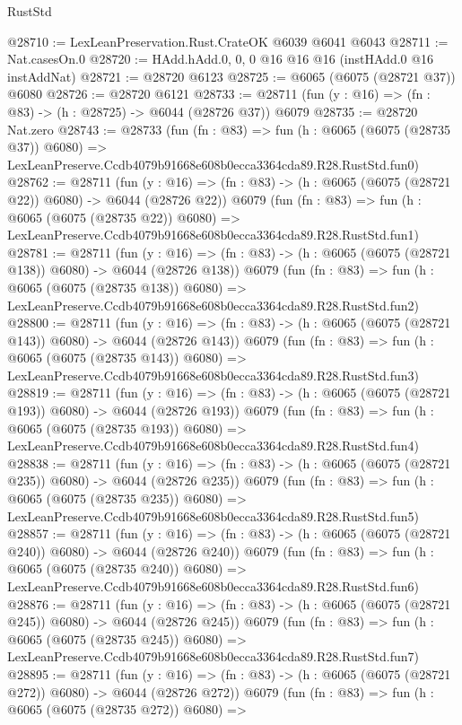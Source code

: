 \begin{lexlean}{RustStd}
\begin{coremodule}
@28710 := LexLeanPreservation.Rust.CrateOK @6039 @6041 @6043
@28711 := Nat.casesOn.{0}
@28720 := HAdd.hAdd.{0, 0, 0} @16 @16 @16 (instHAdd.{0} @16 instAddNat)
@28721 := @28720 @6123
@28725 := @6065 (@6075 (@28721 @37)) @6080
@28726 := @28720 @6121
@28733 := @28711 (fun (y : @16) => (fn : @83) -> (h : @28725) -> @6044 (@28726 @37)) @6079
@28735 := @28720 Nat.zero
@28743 := @28733
    (fun (fn : @83) =>
    fun (h : @6065 (@6075 (@28735 @37)) @6080) =>
    LexLeanPreserve.Ccdb4079b91668e608b0ecca3364cda89.R28.RustStd.fun0)
@28762 := @28711
    (fun (y : @16) => (fn : @83) -> (h : @6065 (@6075 (@28721 @22)) @6080) -> @6044 (@28726 @22))
    @6079
    (fun (fn : @83) =>
    fun (h : @6065 (@6075 (@28735 @22)) @6080) =>
    LexLeanPreserve.Ccdb4079b91668e608b0ecca3364cda89.R28.RustStd.fun1)
@28781 := @28711
    (fun (y : @16) => (fn : @83) -> (h : @6065 (@6075 (@28721 @138)) @6080) -> @6044 (@28726 @138))
    @6079
    (fun (fn : @83) =>
    fun (h : @6065 (@6075 (@28735 @138)) @6080) =>
    LexLeanPreserve.Ccdb4079b91668e608b0ecca3364cda89.R28.RustStd.fun2)
@28800 := @28711
    (fun (y : @16) => (fn : @83) -> (h : @6065 (@6075 (@28721 @143)) @6080) -> @6044 (@28726 @143))
    @6079
    (fun (fn : @83) =>
    fun (h : @6065 (@6075 (@28735 @143)) @6080) =>
    LexLeanPreserve.Ccdb4079b91668e608b0ecca3364cda89.R28.RustStd.fun3)
@28819 := @28711
    (fun (y : @16) => (fn : @83) -> (h : @6065 (@6075 (@28721 @193)) @6080) -> @6044 (@28726 @193))
    @6079
    (fun (fn : @83) =>
    fun (h : @6065 (@6075 (@28735 @193)) @6080) =>
    LexLeanPreserve.Ccdb4079b91668e608b0ecca3364cda89.R28.RustStd.fun4)
@28838 := @28711
    (fun (y : @16) => (fn : @83) -> (h : @6065 (@6075 (@28721 @235)) @6080) -> @6044 (@28726 @235))
    @6079
    (fun (fn : @83) =>
    fun (h : @6065 (@6075 (@28735 @235)) @6080) =>
    LexLeanPreserve.Ccdb4079b91668e608b0ecca3364cda89.R28.RustStd.fun5)
@28857 := @28711
    (fun (y : @16) => (fn : @83) -> (h : @6065 (@6075 (@28721 @240)) @6080) -> @6044 (@28726 @240))
    @6079
    (fun (fn : @83) =>
    fun (h : @6065 (@6075 (@28735 @240)) @6080) =>
    LexLeanPreserve.Ccdb4079b91668e608b0ecca3364cda89.R28.RustStd.fun6)
@28876 := @28711
    (fun (y : @16) => (fn : @83) -> (h : @6065 (@6075 (@28721 @245)) @6080) -> @6044 (@28726 @245))
    @6079
    (fun (fn : @83) =>
    fun (h : @6065 (@6075 (@28735 @245)) @6080) =>
    LexLeanPreserve.Ccdb4079b91668e608b0ecca3364cda89.R28.RustStd.fun7)
@28895 := @28711
    (fun (y : @16) => (fn : @83) -> (h : @6065 (@6075 (@28721 @272)) @6080) -> @6044 (@28726 @272))
    @6079
    (fun (fn : @83) =>
    fun (h : @6065 (@6075 (@28735 @272)) @6080) =>

\end{coremodule}
\end{lexlean}
